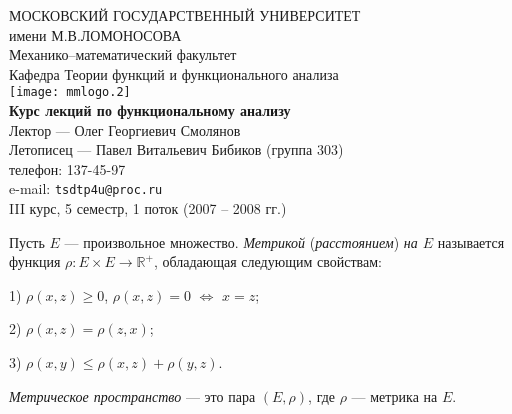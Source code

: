 \documentclass[12pt,titlepage, a4paper]{article}
\begin{document}
\begin{titlepage}
\begin{center}
\vspace*{-20pt}
\textsf{%
{\Large МОСКОВСКИЙ ГОСУДАРСТВЕННЫЙ УНИВЕРСИТЕТ \\%
\vspace{5pt}%
имени М.В.ЛОМОНОСОВА}\\%
\vspace{25pt} %
{\Large Механико--математический факультет}\\%
\vspace{15pt} %
{\large Кафедра Теории функций и функционального анализа\\}%
\vspace{40pt}%
\texttt{[image: mmlogo.2]}\\ %
\vspace{40pt}%
{\LARGE\textbf{Курс лекций по функциональному анализу\\} }%
\vspace{25pt} %
Лектор --- Олег Георгиевич Смолянов\\ %
\vspace{20pt}%
Летописец --- Павел Витальевич Бибиков (группа 303)\\
телефон: 137-45-97\\
e-mail: {\normalfont \verb"tsdtp4u@proc.ru"}\\
\vspace{40pt}}%
III курс, 5 семестр, 1 поток (2007 -- 2008 гг.)
\end{center}
\end{titlepage}
\lecture

\vspace{-25pt}


\begin{defen}
Пусть $E$ --- произвольное множество. \emph{Метрикой}
(\emph{расстоянием}) \emph{на $E$} называется функция $\rho\colon
E\times E\to \mathbb{R}^+$, обладающая следующим свойствам:

1) $\rho(x,z)\geqslant 0$, $\rho(x,z)=0$ $\Leftrightarrow$ $x=z$;

2) $\rho(x,z)=\rho(z,x)$;

3) $\rho(x,y)\leqslant\rho(x,z)+\rho(y,z)$.

\emph{Метрическое пространство} --- это пара $(E,\rho)$, где $\rho$
--- метрика на $E$.
\end{defen}
\end{document}
